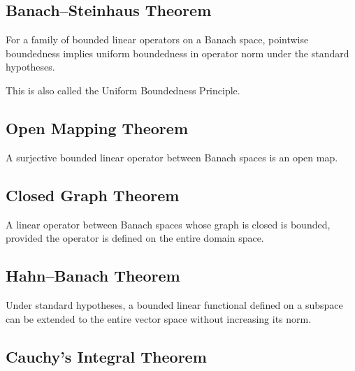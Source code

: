 \subsection{Banach--Steinhaus Theorem}
\label{subsec:uniform-boundedness-summary}

For a family of bounded linear operators on a Banach space, pointwise
boundedness implies uniform boundedness in operator norm under the standard
hypotheses.

This is also called the Uniform Boundedness Principle.

\subsection{Open Mapping Theorem}
\label{subsec:open-mapping-summary}

A surjective bounded linear operator between Banach spaces is an open map.

\subsection{Closed Graph Theorem}
\label{subsec:closed-graph-summary}

A linear operator between Banach spaces whose graph is closed is bounded,
provided the operator is defined on the entire domain space.

\subsection{Hahn--Banach Theorem}
\label{subsec:hahn-banach-summary}

Under standard hypotheses, a bounded linear functional defined on a subspace
can be extended to the entire vector space without increasing its norm.

\subsection{Cauchy's Integral Theorem}
\label{subsec:cauchy-integral-theorem-summary}


